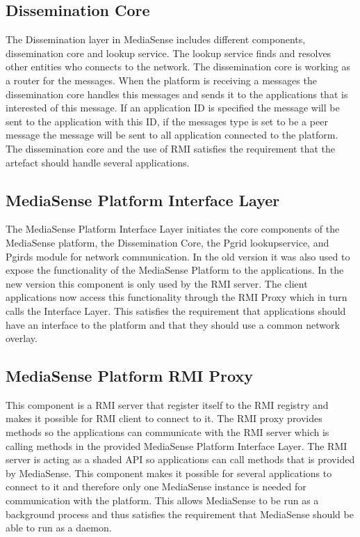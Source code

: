 \subsection{Dissemination Core}
The Dissemination layer in MediaSense includes different components, dissemination core and lookup service. The lookup service finds and resolves other entities who connects to the network. The dissemination core is working as a router for the messages. When the platform is receiving a messages the dissemination core handles this messages and sends it to the applications that is interested of this message. If an application ID is specified the message will be sent to the application with this ID, if the messages type is set to be a peer message the message will be sent to all application connected to the platform. The dissemination core and the use of RMI satisfies the requirement that the artefact should handle several applications.

\subsection{MediaSense Platform Interface Layer}
The MediaSense Platform Interface Layer initiates the core components of the MediaSense platform, the Dissemination Core, the Pgrid lookupservice, and Pgirds module for network communication. In the old version it was also used to expose the functionality of the MediaSense Platform to the applications. In the new version this component is only used by the RMI server. The client applications now access this functionality through the RMI Proxy which in turn calls the Interface Layer. This satisfies the requirement that applications should have an interface to the platform and that they should use a common network overlay.

\subsection{MediaSense Platform RMI Proxy}
This component is a RMI server that register itself to the RMI registry and makes it possible for RMI client to connect to it. The RMI proxy provides methods so the applications can communicate with the RMI server which is calling methods in the provided MediaSense Platform Interface Layer. The RMI server is acting as a shaded API so applications can call methods that is provided by MediaSense. This component makes it possible for several applications to connect to it and therefore only one MediaSense instance is needed for communication with the platform. This allows MediaSense to be run as a background process and thus satisfies the requirement that MediaSense should be able to run as a daemon.

